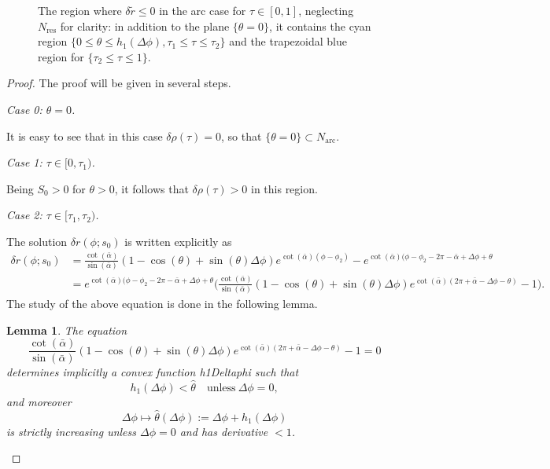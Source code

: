 \documentclass[reqno]{amsart}
\theoremstyle{definition} \newtheorem{definition}{Definition}[section]
\theoremstyle{definition} \newtheorem{remark}[definition]{Remark}
\theoremstyle{plain} \newtheorem{lemma}[definition]{Lemma}
\theoremstyle{plain} \newtheorem{proposition}[definition]{Proposition}
\theoremstyle{plain} \newtheorem{theorem}[definition]{Theorem}
\theoremstyle{plain} \newtheorem{corollary}[definition]{Corollary}
\theoremstyle{definition} \newtheorem{example}[definition]{Example}
\theoremstyle{plain} \newtheorem{claim}[clai]{Claim}
\theoremstyle{definition} \newtheorem{assumption}[definition]{Assumption}
\theoremstyle{definition} \newtheorem{observation}[definition]{Observation}
\newcommand{\1}{\mathbbm 1}
\numberwithin{equation}{section} %
\theoremstyle{plain} \newtheorem*{theorem*}{Theorem}
\theoremstyle{plain} \newtheorem{mthm}[maintheorem]{Main Theorem}
\theoremstyle{plain} \newtheorem*{mthm*}{Main Theorem}
\theoremstyle{plain} \newtheorem*{conjecture*}{Conjecture}
\theoremstyle{plain} \newtheorem{conjecture}[definition]{Conjecture}
\theoremstyle{plain} \newtheorem*{problem*}{Problem}
\begin{document}
\begin{figure}
\resizebox{.75\textwidth}{!}{}
\caption{The region where $\delta \tilde r \leq 0$ in the arc case for $\tau \in [0,1]$, neglecting $N_\mathrm{res}$ for clarity: in addition to the plane $\{\theta = 0\}$, it contains the cyan region $\{0 \leq \theta \leq h_1(\Delta \phi), \tau_1 \leq \tau \leq \tau_2\}$ and the trapezoidal blue region for $\{\tau_2 \leq \tau \leq 1\}$.}
\label{Fig:nega_arc_case}
\end{figure}

\begin{proof}
The proof will be given in several steps.


\medskip

{\it Case 0: $\theta = 0$.}

\noindent It is easy to see that in this case $\delta \rho(\tau) = 0$, so that $\{\theta = 0\} \subset N_{\mathrm{arc}}$.

\medskip

{\it Case 1: $\tau \in [0,\tau_1)$.}

\noindent Being $S_0 > 0$ for $\theta > 0$, it follows that $\delta \rho(\tau) > 0$ in this region.


\medskip

{\it Case 2: $\tau \in [\tau_1,\tau_2)$.}

\noindent The solution $\delta r(\phi;s_0)$ is written explicitly as
\begin{align*}
\delta r(\phi;s_0) &= \frac{\cot(\bar \alpha)}{\sin(\bar \alpha)} (1 - \cos(\theta) + \sin(\theta) \Delta \phi) e^{\cot(\bar \alpha) (\phi - \phi_2)} - e^{\cot(\bar \alpha) (\phi - \phi_2 - 2\pi - \bar \alpha + \Delta \phi + \theta} \\
&= e^{\cot(\bar \alpha)(\phi - \phi_2 - 2\pi - \bar \alpha + \Delta \phi + \theta} \bigg( \frac{\cot(\bar \alpha)}{\sin(\bar \alpha)} (1 - \cos(\theta) + \sin(\theta) \Delta \phi) e^{\cot(\bar \alpha) (2\pi + \bar \alpha - \Delta \phi - \theta)} - 1 \bigg). 
\end{align*}
The study of the above equation is done in the following lemma.

\begin{lemma}
\label{Lem:study_g_1_arc}
The equation
\begin{equation*}
\frac{\cot(\bar \alpha)}{\sin(\bar \alpha)} (1 - \cos(\theta) + \sin(\theta) \Delta \phi) e^{\cot(\bar \alpha) (2\pi + \bar \alpha - \Delta \phi - \theta)} - 1 = 0
\end{equation*}
determines implicitly a convex function \gls{h1Deltaphi} such that
\begin{equation*}
h_1(\Delta \phi) < \hat \theta \quad \text{unless} \ \Delta \phi = 0,
\end{equation*}
and moreover
\begin{equation*}
\Delta \phi \mapsto \hat \theta(\Delta \phi) := \Delta \phi + h_1(\Delta \phi)
\end{equation*}
is strictly increasing unless $\Delta \phi = 0$ and has derivative $<1$.
\end{lemma}


\end{proof}
\end{document}
